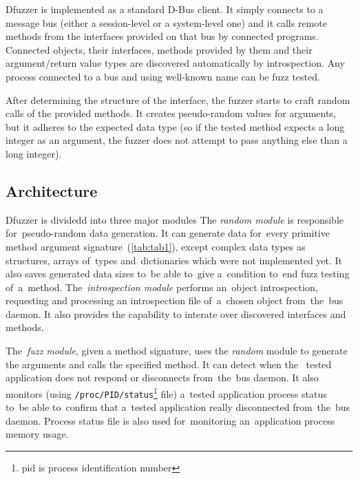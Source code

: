 \documentclass[conference]{IEEEtran}
\begin{document}
Dfuzzer is implemented as a standard D-Bus client. It simply connects to a
message bus (either a session-level or a system-level one) and it calls remote
methods from the interfaces provided on that bus by connected programs.
Connected objects, their interfaces, methods provided by them and their
argument/return value types are discovered automatically by introspection. Any process connected to a bus and using well-known name can be fuzz tested.

After determining the structure of the interface, the fuzzer starts to craft
random calls of the provided methods. It creates pseudo-random values for
arguments, but it adheres to the expected data type (so if the tested method
expects a long integer as an argument, the fuzzer does not attempt to pass
anything else than a long integer).

\subsection{Architecture}
Dfuzzer is dividedd into three major modules The \emph{random module} is
responsible for~pseudo-random data generation. It can generate data for~every
primitive method argument signature~(\ref{tab:tab1}), except complex data types
as structures, arrays of~types and~dictionaries which were not implemented yet.
It also saves generated data sizes to~be able to~give a~condition to~end fuzz
testing of~a~method. The~\emph{introspection module} performs an~object
introspection, requesting and processing an introspection file of~a~chosen
object from~the~bus daemon. It also provides the capability to interate over
discovered interfaces and methods.

The~\emph{fuzz module}, given a method signature, uses the \emph{random} module
to generate the arguments and calls the specified method. It can detect when
the ~tested application does not respond or disconnects from~the~bus daemon.
It also monitors (using \texttt{/proc/PID/status}\footnote{pid is process
identification number} file) a~tested application process status to~be able
to~confirm that a~tested application really disconnected from~the~bus daemon.
Process status file is also used for~monitoring an~application process memory
usage.
\end{document}
